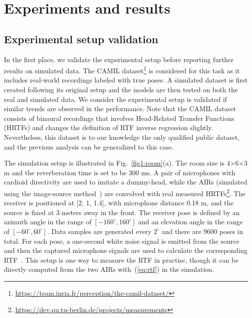 \documentclass[journal]{IEEEtran}
\begin{document}
\section{Experiments and results}

\subsection{Experimental setup validation}

In the first place, we validate the experimental setup before reporting further results on simulated data. The CAMIL dataset\footnote{\url{https://team.inria.fr/perception/the-camil-dataset/}} is considered for this task as it includes real-world recordings labeled with true poses. A simulated dataset is first created following its original setup and the models are then tested on both the real and simulated data. We consider the experimental setup is validated if similar trends are observed in the performance. Note that the CAMIL dataset consists of binaural recordings that involves Head-Related Transfer Functions (HRTFs) and changes the definition of RTF inverse regression slightly. Nevertheless, this dataset is to our knowledge the only qualified public dataset, and the previous analysis can be generalized to this case.

The simulation setup is illustrated in Fig.~\ref{fig1:room}(a). The room size is 4$\times$6$\times$3 m and the reverberation time is set to be 300 ms. A pair of microphones with cardioid directivity are used to imitate a dummy-head, while the AIRs (simulated using the image-source method~\cite{allen1979image}) are convolved with real measured  HRTFs\footnote{\url{https://dev.qu.tu-berlin.de/projects/measurements}}. The receiver is positioned at $[$2, 1, 1.4$]$, with microphone distance 0.18 m, and the source is fixed at 3 meters away in the front. The receiver pose is defined by an azimuth angle in the range of $[-160^{\circ}, 160^{\circ}]$ and an elevation angle in the range of $[-60^{\circ}, 60^{\circ}]$. Data samples are generated every $2^{\circ}$ and there are 9600 poses in total. For each pose, a one-second white noise signal is emitted from the source and then the captured microphone signals are used to calculate the corresponding RTF~\cite{deleforge2015acoustic}. This setup is one way to measure the RTF in practise, though it can be directly computed from the two AIRs with~(\ref{eq:rtf}) in the simulation.
\end{document}
